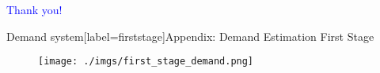 \documentclass[notes,11pt, aspectratio=169]{beamer}
\begin{document}
\begin{frame}
\textcolor{blue}{\huge{\centerline{Thank you!}}}
\end{frame}

%    
%    


\appendix

\begin{frame}{Demand system}[label=firststage]{Appendix: Demand Estimation First Stage \hyperlink{demand}{}}
    \vspace{0.5cm}
      
        \begin{figure}[t*]
          \centering
    
          \texttt{[image: ./imgs/first\_stage\_demand.png]}
        \end{figure}
        
      \end{frame}
\end{document}
